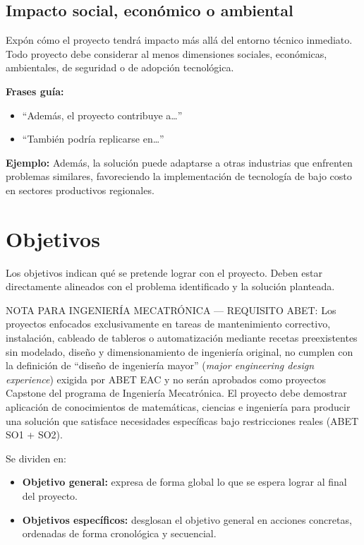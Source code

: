 \documentclass[12pt,letterpaper]{report}
\begin{document}
\subsection{Impacto social, económico o ambiental}
\begin{instrucciones}
Expón cómo el proyecto tendrá impacto más allá del entorno técnico inmediato. Todo proyecto debe considerar al menos dimensiones sociales, económicas, ambientales, de seguridad o de adopción tecnológica.

\vspace{2mm}
\noindent \textbf{Frases guía:}
\begin{itemize}
  \item ``Además, el proyecto contribuye a\ldots''
  \item ``También podría replicarse en\ldots''
\end{itemize}

\noindent \textbf{Ejemplo:} Además, la solución puede adaptarse a otras industrias que enfrenten problemas similares, favoreciendo la implementación de tecnología de bajo costo en sectores productivos regionales.
\end{instrucciones}

\section{Objetivos}
\begin{instrucciones}
Los objetivos indican qué se pretende lograr con el proyecto. Deben estar directamente alineados con el problema identificado y la solución planteada.


\begin{advertenciaABET}
NOTA PARA INGENIERÍA MECATRÓNICA --- REQUISITO ABET: Los proyectos enfocados exclusivamente en tareas de mantenimiento correctivo, instalación, cableado de tableros o automatización mediante recetas preexistentes sin modelado, diseño y dimensionamiento de ingeniería original, no cumplen con la definición de ``diseño de ingeniería mayor'' (\textsl{major engineering design experience}) exigida por ABET EAC y no serán aprobados como proyectos Capstone del programa de Ingeniería Mecatrónica. El proyecto debe demostrar aplicación de conocimientos de matemáticas, ciencias e ingeniería para producir una solución que satisface necesidades específicas bajo restricciones reales (ABET SO1 + SO2).
\end{advertenciaABET}

\vspace{2mm}
\noindent Se dividen en:
\begin{itemize}
  \item \textbf{Objetivo general:} expresa de forma global lo que se espera lograr al final del proyecto.
  \item \textbf{Objetivos específicos:} desglosan el objetivo general en acciones concretas, ordenadas de forma cronológica y secuencial.
\end{itemize}
\end{instrucciones}
\end{document}
